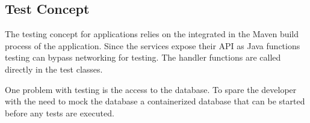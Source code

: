 \subsection{Test Concept}

The testing concept for \ms{} applications relies on the integrated in the
Maven build process of the application. Since the services expose their API as
Java functions testing can bypass networking for testing. The handler functions
are called directly in the test classes.

One problem with \ms{} testing is the access to the database. To spare the
developer with the need to mock the database a containerized database that can
be started before any tests are executed.
